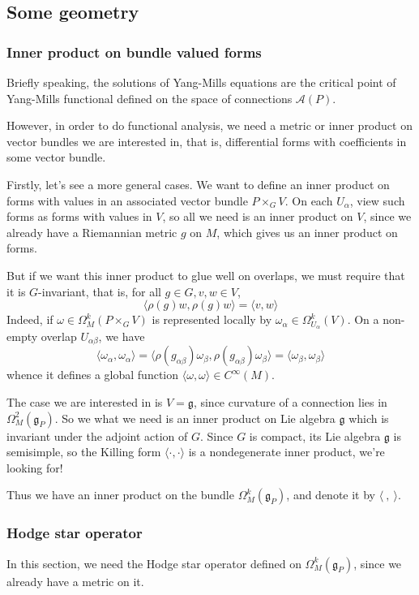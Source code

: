 \documentclass[11pt]{amsart}
\numberwithin{equation}{section}
\theoremstyle{plain}
\theoremstyle{plain}
\numberwithin{equation}{section}
\begin{document}
\subsection{Some geometry}
\subsubsection{Inner product on bundle valued forms}
Briefly speaking, the solutions of Yang-Mills equations are the critical point of Yang-Mills functional defined on the space of connections $\mathscr{A}(P)$. 

However, in order to do functional analysis, we need a metric or inner product on vector bundles we are interested in, that is, differential forms with coefficients in some vector bundle.

Firstly, let's see a more general cases. We want to define an inner product on forms with values in an associated vector bundle $P\times_GV$. On each $U_{\alpha}$, view such forms as forms with values in $V$, so all we need is an inner product on $V$, since we already have a Riemannian metric $g$ on $M$, which gives us an inner product on forms.

But if we want this inner product to glue well on overlaps, we must require that it is $G$-invariant, that is, for all $g\in G,v,w\in V$,
$$
\langle\rho(g)w,\rho(g)w\rangle=\langle v,w\rangle
$$
Indeed, if $\omega\in\Omega_M^k(P\times_GV)$ is represented locally by $\omega_{\alpha}\in\Omega^k_{U_{\alpha}}(V)$. On a non-empty overlap $U_{\alpha\beta}$, we have
$$
\langle\omega_{\alpha},\omega_{\alpha}\rangle=\langle\rho(g_{\alpha\beta})\omega_{\beta},\rho(g_{\alpha\beta})\omega_{\beta}\rangle=\langle\omega_{\beta},\omega_{\beta}\rangle
$$
whence it defines a global function $\langle\omega,\omega\rangle\in C^{\infty}(M)$.

The case we are interested in is $V=\mathfrak{g}$, since curvature of a connection lies in $\Omega_M^2(\mathfrak{g}_P)$. So we what we need is an inner product on Lie algebra $\mathfrak{g}$ which is invariant under the adjoint action of $G$. Since $G$ is compact, its Lie algebra $\mathfrak{g}$ is semisimple, so the Killing form $\langle\cdot,\cdot\rangle$ is a nondegenerate inner product, we're looking for!

Thus we have an inner product on the bundle $\Omega_M^k(\mathfrak{g}_P)$, and denote it by $\langle~,~\rangle$.
\subsubsection{Hodge star operator}
In this section, we need the Hodge star operator defined on $\Omega^k_M(\mathfrak{g}_P)$, since we already have a metric on it.
 
\end{document}
